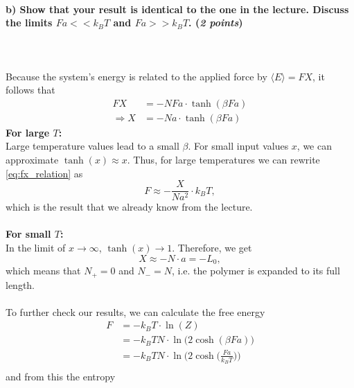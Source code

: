 \paragraph{b) Show that your result is identical to the one in the lecture.
    Discuss the limits $Fa<<k_BT$ and $Fa>>k_BT$. (\textit{2 points})
} \ \\
    \\
    Because the system's energy is related to the applied force by 
    $\langle E\rangle=FX$, it follows that 
    \begin{align}
        FX
        &=-NFa\cdot\tanh(\beta Fa) \\
        \Rightarrow X
        &=-Na\cdot\tanh(\beta Fa)
        \label{eq:fx_relation}
    \end{align}
    \textbf{For large $T$:} \\
    Large temperature values lead to a small $\beta$.
    For small input values $x$, we can approximate $\tanh(x)\approx x$.
    Thus, for large temperatures we can rewrite \autoref{eq:fx_relation} as
    \begin{equation}
        F\approx-\frac{X}{Na^2}\cdot k_BT,
    \end{equation}
    which is the result that we already know from the lecture. \\
    \\
    \textbf{For small $T$:} \\
    In the limit of $x\to\infty$, $\tanh(x)\to1$. Therefore, we get 
    \begin{equation}
        X\approx-N\cdot a=-L_0,
    \end{equation}
    which means that $N_+=0$ and $N_-=N$, i.e. the polymer is expanded to its 
    full length. \\
    \\
    \noindent
    To further check our results, we can calculate the free energy
    \begin{align}
        F
        &=-k_BT\cdot\ln(Z) \\
        &=-k_BTN\cdot\ln\bigg(2\cosh(\beta Fa)\bigg) \\
        &=-k_BTN\cdot\ln\bigg(2\cosh\bigg(\frac{Fa}{k_BT}\bigg)\bigg) \\
    \end{align}
    and from this the entropy
